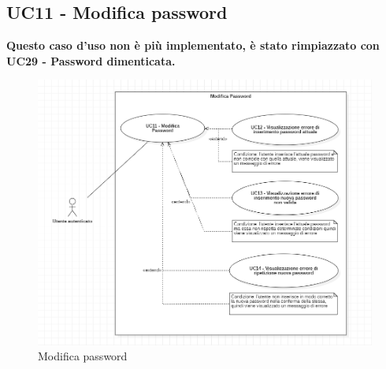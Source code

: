\subsection{UC11 - Modifica password}
\textbf{Questo caso d'uso non è più implementato, è stato rimpiazzato con UC29 - Password dimenticata.}
\begin{figure}[H]
    \includegraphics[width=15cm]{sezioni/Images/UC11.png}
    \centering
    \caption{Modifica password}
\end{figure}

